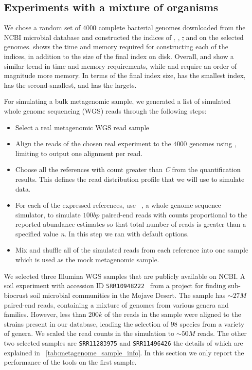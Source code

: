 \subsection{Experiments with a mixture of organisms}

We chose a random set of $4000$ complete bacterial genomes
downloaded from the NCBI microbial database and constructed the indices of \puffaligner, \bt, \st, and 
\debga on the selected genomes.  shows the time and memory required for constructing 
each of the indices, in addition to the size of the final index on disk.
Overall, \puffaligner and \bt show a similar trend in time and memory requirements, while \st and \debga 
require an order of magnitude more memory. In terms of the final index size, \bt has the smallest index, 
\puffaligner has the second-smallest, and \st has the largets.

For simulating a bulk metagenomic sample, we generated a list of
simulated whole genome sequencing (WGS) reads through the following steps:
\begin{itemize}
    \item Select a real metagenomic WGS read sample
    \item Align the reads of the chosen real experiment
    to the $4000$ genomes using \bt, limiting \bt to output one alignment per read.
    \item Choose all the references with count greater than \emph{C} from the quantification results.
    This defines the read distribution profile that we will use to simulate data.
    \item For each of the expressed references, use \mason~\citep{holtgrewe2010mason}, a whole genome 
    sequence simulator, to simulate $100bp$ paired-end reads with counts proportional to the reported 
    abundance estimates so that total number of reads is greater than a specified value \emph{n}.
    In this step we ran \mason with default options.
    \item Mix and shuffle all of the simulated reads from each reference into one sample which is used as 
    the mock metagenomic sample.
\end{itemize}

We selected three Illumina WGS samples that are publicly available on NCBI.
A soil experiment with accession ID \texttt{SRR10948222}~\citep{SRR10948222}
from a project for finding sub-biocrust soil microbial communities in the Mojave Desert.
The sample has $\sim27M$ paired-end reads, containing a mixture of genomes from various genera and families.
However, less than $200k$ of the reads in the sample were aligned to the strains present in our database,
leading the selection of $98$ species from a variety of genera.
We scaled the read counts in the simulation to $\sim50M$ reads. The other two selected samples are 
\texttt{SRR11283975} and \texttt{SRR11496426}
the details of which are explained in ~\ref{tab:metagenome_sample_info}.
In this section we only report the performance of the tools on the first sample.

